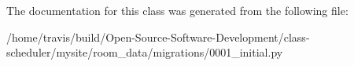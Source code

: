 The documentation for this class was generated from the following file\-:\begin{DoxyCompactItemize}
\item 
/home/travis/build/\-Open-\/\-Source-\/\-Software-\/\-Development/class-\/scheduler/mysite/room\-\_\-data/migrations/0001\-\_\-initial.\-py\end{DoxyCompactItemize}
